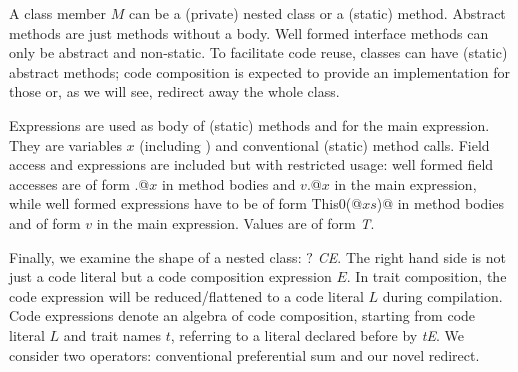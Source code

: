 A class member $M$ can be a (private) nested class or a (static) method.
Abstract methods are just methods without a body. 
Well formed interface methods can only be abstract and non-static.
To facilitate code reuse, classes can have (static) abstract methods; code composition is expected to 
provide an implementation for those or, as we will see, redirect away the whole class.

Expressions are used as body of (static) methods and for the main expression.
They are variables $x$ (including \Q@this@)
and conventional (static) method calls.
Field access and \Q@new@ expressions are included but with restricted usage:
well formed field accesses are of form \Q@this.@$x$ in method bodies and
$v$\Q@.@$x$  in the main expression, while 
well formed \Q@new@ expressions have to be of form \Q@new This0(@$xs$\Q@)@ in method bodies
and of form $v$ in the main expression.
Values are of form \textit{ T}.


Finally, we examine the shape of a nested class: \textit{$?$ C\eq{}E}.
The right hand side is not just a code literal but a code composition expression $E$.
In trait composition, the code expression will be reduced/flattened to a code literal $L$
during compilation.
Code expressions denote an algebra of code composition, starting from code literal $L$
and trait names $t$, referring to a literal declared before by \textit{t\eq{}E}.
We consider two operators: conventional preferential sum 
 \textit{} and our novel redirect\textit{}.

